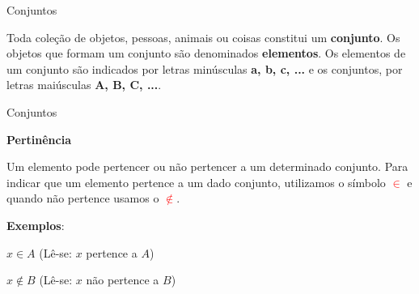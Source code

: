 \documentclass[11pt, openright, a4paper, brazil, english, french, spanish, bibjustif, xcolor=table,aspectratio=169]{beamer}
\begin{document}
\begin{frame}[t]{Conjuntos}

\medskip

\begin{minipage}{\columnwidth}

Toda coleção de objetos, pessoas, animais ou coisas constitui um \textbf{conjunto}. Os objetos que formam um conjunto são denominados \textbf{elementos}. Os elementos de um conjunto são indicados por letras minúsculas \textbf{a, b, c, ...} e os conjuntos, por letras maiúsculas \textbf{A, B, C, ...}.

\end{minipage}

\end{frame}

\begin{frame}[t]{Conjuntos}
\medskip

\textbf{Pertinência}

\medskip

\begin{minipage}{\columnwidth}

Um elemento pode pertencer ou não pertencer a um determinado conjunto. Para indicar que um elemento pertence a um dado conjunto, utilizamos o símbolo \textcolor{red}{$\in$} e quando não pertence usamos o \textcolor{red}{$\not\in$}.

\medskip

\pause

\textbf{Exemplos}:

$x \in A$ (Lê-se: $x$ pertence a $A$)

$x \not\in B$ (Lê-se: $x$ não pertence a $B$) 

\end{minipage}

\end{frame}
\end{document}

